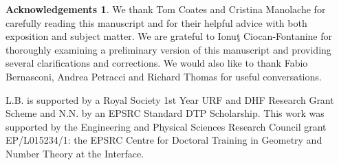 \documentclass[11pt]{amsart}
\theoremstyle{definition}
\theoremstyle{definition}
\newtheorem*{acknowledgements}{Acknowledgements}
\begin{document}
\begin{acknowledgements} We thank Tom Coates and Cristina Manolache for carefully reading this manuscript and for their helpful advice with both exposition and subject matter. We are grateful to Ionu\c{t} Ciocan-Fontanine for thoroughly examining a preliminary version of this manuscript and providing several clarifications and corrections. We would also like to thank Fabio Bernasconi, Andrea Petracci and Richard Thomas for useful conversations. 

L.B. is supported by a Royal Society 1st Year URF and DHF Research Grant Scheme and N.N. by an EPSRC Standard DTP Scholarship.
This work was supported by the Engineering and Physical Sciences Research Council grant EP/L015234/1: the EPSRC Centre for Doctoral Training in Geometry and Number Theory at the Interface.
\end{acknowledgements}
\end{document}
